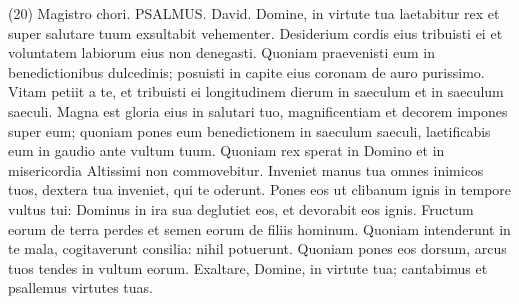 \begin{biblechapter}  (20) 
\verse  Magistro chori. PSALMUS. David. 
\verse Domine, in virtute tua laetabitur rex et super salutare tuum exsultabit vehementer. 
\verse Desiderium cordis eius tribuisti ei et voluntatem labiorum eius non denegasti. 
\verse Quoniam praevenisti eum in benedictionibus dulcedinis; posuisti in capite eius coronam de auro purissimo. 
\verse Vitam petiit a te, et tribuisti ei longitudinem dierum in saeculum et in saeculum saeculi. 
\verse Magna est gloria eius in salutari tuo, magnificentiam et decorem impones super eum; 
\verse quoniam pones eum benedictionem in saeculum saeculi, laetificabis eum in gaudio ante vultum tuum. 
\verse Quoniam rex sperat in Domino et in misericordia Altissimi non commovebitur. 
\verse Inveniet manus tua omnes inimicos tuos, dextera tua inveniet, qui te oderunt. 
\verse Pones eos ut clibanum ignis in tempore vultus tui: Dominus in ira sua deglutiet eos, et devorabit eos ignis. 
\verse Fructum eorum de terra perdes et semen eorum de filiis hominum. 
\verse Quoniam intenderunt in te mala, cogitaverunt consilia: nihil potuerunt. 
\verse Quoniam pones eos dorsum, arcus tuos tendes in vultum eorum. 
\verse Exaltare, Domine, in virtute tua; cantabimus et psallemus virtutes tuas. 
\end{biblechapter}


